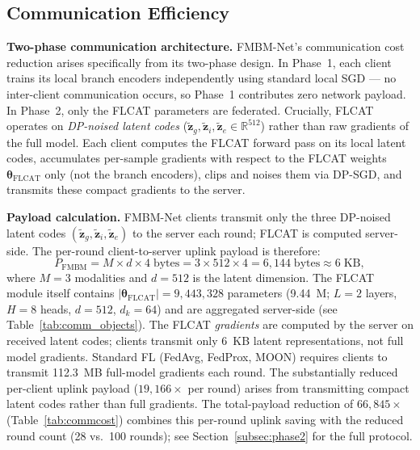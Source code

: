 \documentclass{ieeeaccess}
\begin{document}
\subsection{Communication Efficiency}
\label{subsec:comm_efficiency}

\textbf{Two-phase communication architecture.}
FMBM-Net's communication cost reduction arises specifically from its
two-phase design. In Phase~1, each client trains its local branch encoders
independently using standard local SGD --- no inter-client communication
occurs, so Phase~1 contributes zero network payload. In Phase~2, only the
FLCAT parameters are federated. Crucially, FLCAT operates on
\emph{DP-noised latent codes} ($\tilde{\mathbf{z}}_g, \tilde{\mathbf{z}}_i,
\tilde{\mathbf{z}}_e \in \mathbb{R}^{512}$) rather than raw gradients of the
full model. Each client computes the FLCAT forward pass on its local latent
codes, accumulates per-sample gradients with respect to the FLCAT weights
$\boldsymbol{\theta}_{\mathrm{FLCAT}}$ only (not the branch encoders), clips
and noises them via DP-SGD, and transmits these compact gradients to the server.

\textbf{Payload calculation.}
FMBM-Net clients transmit only the three DP-noised latent codes
$(\tilde{\mathbf{z}}_g, \tilde{\mathbf{z}}_i, \tilde{\mathbf{z}}_e)$
to the server each round; FLCAT is computed server-side. The per-round
client-to-server uplink payload is therefore:
\begin{equation}
P_{\mathrm{FMBM}} = M \times d \times 4\;\text{bytes}
= 3 \times 512 \times 4 = 6{,}144\;\text{bytes} \approx 6\;\text{KB},
\label{eq:payload}
\end{equation}
where $M\!=\!3$ modalities and $d\!=\!512$ is the latent dimension.
The FLCAT module itself contains
$|\boldsymbol{\theta}_{\mathrm{FLCAT}}|\!=\!9{,}443{,}328$ parameters
(9.44~M; $L\!=\!2$ layers, $H\!=\!8$ heads, $d\!=\!512$, $d_k\!=\!64$)
and are aggregated server-side (see Table~\ref{tab:comm_objects}).
The FLCAT \emph{gradients} are computed by the server on received
latent codes; clients transmit only 6~KB latent representations, not
full model gradients. Standard FL (FedAvg, FedProx, MOON) requires
clients to transmit 112.3~MB full-model gradients each round. The
substantially reduced per-client uplink payload ($19{,}166\!\times$
per round) arises from transmitting compact latent codes rather than
full gradients. The total-payload reduction of $66{,}845\!\times$
(Table~\ref{tab:commcost}) combines this per-round uplink saving with
the reduced round count (28 vs.~100 rounds); see Section~\ref{subsec:phase2}
for the full protocol.
\end{document}

